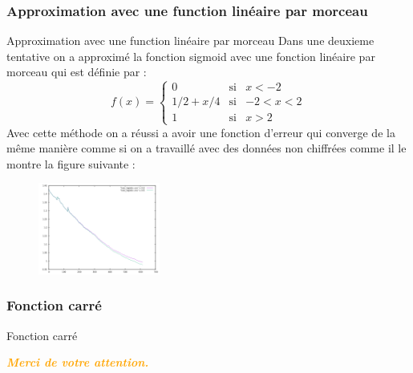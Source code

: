\documentclass{beamer}
\begin{document}
\subsubsection{Approximation avec une function linéaire par morceau}
\begin{frame}{Approximation avec une function linéaire par morceau}
Dans une deuxieme tentative on a approximé la fonction sigmoid avec une fonction linéaire par morceau  qui est définie par :\newline
 \begin{equation}
f(x)=
\left\lbrace
\begin{array}{ccc}
0  & \mbox{si} & x<-2\\
1/2 + x/4 & \mbox{si} & -2<x<2\\
1 & \mbox{si} & x>2
\end{array}\right.
\end{equation}
Avec cette méthode on a réussi a avoir une fonction d'erreur qui converge de la même manière comme si on a travaillé avec des données non chiffrées comme il le montre la figure suivante :
\begin{figure}[h!]\begin{center}
             \includegraphics[width=4cm]{loss_logistic_regression.png}
             \end{center}
             \end{figure}
\end{frame}
\subsubsection{Fonction carré}
\begin{frame}{Fonction carré}
\end{frame}
\begin{frame}
	\begin{center}
	\textcolor{orange}{\textbf{\textit{Merci de votre attention.}}}
	\end{center}
\end{frame}
\end{document}
